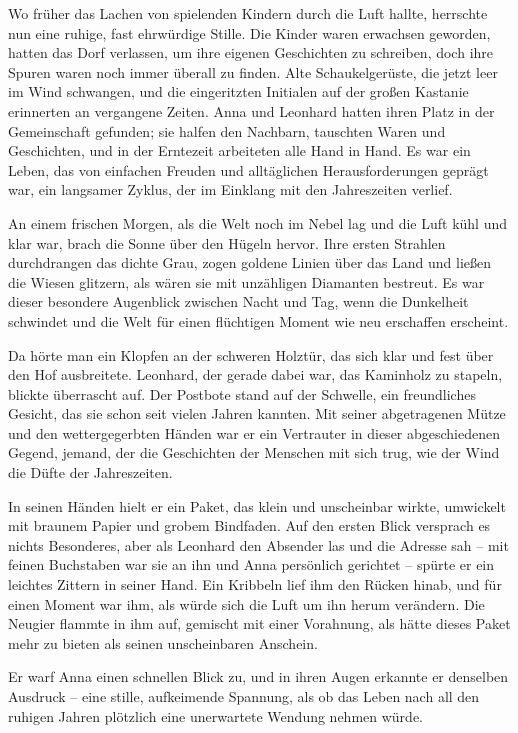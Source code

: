 \documentclass[
]{article}
\begin{document}
Wo früher das Lachen von spielenden Kindern durch die Luft hallte,
herrschte nun eine ruhige, fast ehrwürdige Stille. Die Kinder waren
erwachsen geworden, hatten das Dorf verlassen, um ihre eigenen
Geschichten zu schreiben, doch ihre Spuren waren noch immer überall zu
finden. Alte Schaukelgerüste, die jetzt leer im Wind schwangen, und die
eingeritzten Initialen auf der großen Kastanie erinnerten an vergangene
Zeiten. Anna und Leonhard hatten ihren Platz in der Gemeinschaft
gefunden; sie halfen den Nachbarn, tauschten Waren und Geschichten, und
in der Erntezeit arbeiteten alle Hand in Hand. Es war ein Leben, das von
einfachen Freuden und alltäglichen Herausforderungen geprägt war, ein
langsamer Zyklus, der im Einklang mit den Jahreszeiten verlief.

An einem frischen Morgen, als die Welt noch im Nebel lag und die Luft
kühl und klar war, brach die Sonne über den Hügeln hervor. Ihre ersten
Strahlen durchdrangen das dichte Grau, zogen goldene Linien über das
Land und ließen die Wiesen glitzern, als wären sie mit unzähligen
Diamanten bestreut. Es war dieser besondere Augenblick zwischen Nacht
und Tag, wenn die Dunkelheit schwindet und die Welt für einen flüchtigen
Moment wie neu erschaffen erscheint.

Da hörte man ein Klopfen an der schweren Holztür, das sich klar und fest
über den Hof ausbreitete. Leonhard, der gerade dabei war, das Kaminholz
zu stapeln, blickte überrascht auf. Der Postbote stand auf der Schwelle,
ein freundliches Gesicht, das sie schon seit vielen Jahren kannten. Mit
seiner abgetragenen Mütze und den wettergegerbten Händen war er ein
Vertrauter in dieser abgeschiedenen Gegend, jemand, der die Geschichten
der Menschen mit sich trug, wie der Wind die Düfte der Jahreszeiten.

In seinen Händen hielt er ein Paket, das klein und unscheinbar wirkte,
umwickelt mit braunem Papier und grobem Bindfaden. Auf den ersten Blick
versprach es nichts Besonderes, aber als Leonhard den Absender las und
die Adresse sah -- mit feinen Buchstaben war sie an ihn und Anna
persönlich gerichtet -- spürte er ein leichtes Zittern in seiner Hand.
Ein Kribbeln lief ihm den Rücken hinab, und für einen Moment war ihm,
als würde sich die Luft um ihn herum verändern. Die Neugier flammte in
ihm auf, gemischt mit einer Vorahnung, als hätte dieses Paket mehr zu
bieten als seinen unscheinbaren Anschein.

Er warf Anna einen schnellen Blick zu, und in ihren Augen erkannte er
denselben Ausdruck -- eine stille, aufkeimende Spannung, als ob das
Leben nach all den ruhigen Jahren plötzlich eine unerwartete Wendung
nehmen würde.
\end{document}
